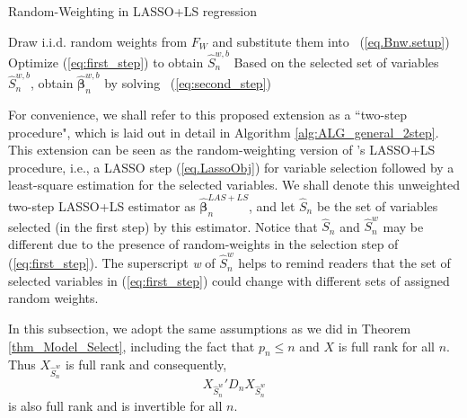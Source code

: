 \documentclass[ejs,authoryear,linksfromyear]{imsart}
\numberwithin{equation}{section}
\theoremstyle{plain}
\begin{document}
\begin{algorithm}
	\SetAlgoLined
	\caption{Random-Weighting in LASSO+LS regression}
	\label{alg:ALG_general_2step}
	 {
		Draw i.i.d. random weights from $F_W$ and substitute them into ~(\ref{eq.Bnw.setup}) \;
		Optimize (\ref{eq:first_step}) to obtain $\widehat{S}_n^{w,b}$ \; 
		Based on the selected set of variables $\widehat{S}_n^{w,b}$, obtain $\widehat{\bm{\beta}}_n^{w,b}$ by solving ~(\ref{eq:second_step}) \; 
	}   
\end{algorithm}

For convenience, we shall refer to this proposed extension as a ``two-step procedure", which is laid out in detail in Algorithm \ref{alg:ALG_general_2step}. This extension can be seen as the random-weighting version of \citet{Liu&Yu}'s LASSO+LS procedure, i.e., a LASSO step (\ref{eq.LassoObj}) for variable selection followed by a least-square estimation for the selected variables. We shall denote this unweighted two-step LASSO+LS estimator as $\widehat{\bm{\beta}}_n^{LAS+LS}$, and let $\widehat{S}_n$ be the set of variables selected (in the first step) by this estimator. Notice that $\widehat{S}_n$ and $\widehat{S}^w_n$ may be different due to the presence of random-weights in the selection step of (\ref{eq:first_step}). The superscript \textit{w} of $\widehat{S}_n^w$ helps to remind readers that the set of selected variables in (\ref{eq:first_step}) could change with different sets of assigned random weights.  

In this subsection, we adopt the same assumptions as we did in Theorem \ref{thm_Model_Select}, including the fact that $p_n \leq n$ and $X$ is full rank for all $n$. Thus $X_{\widehat{S}^w_n}$ is full rank and consequently, 
$$
X_{\widehat{S}^w_n}' D_n X_{\widehat{S}^w_n}
$$
is also full rank and is invertible for all $n$.   
\end{document}
